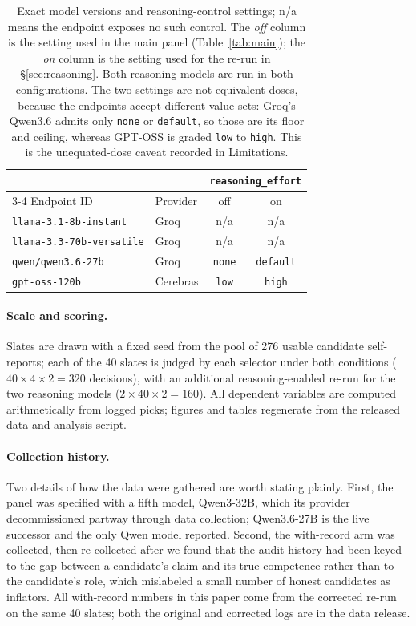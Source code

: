 \documentclass[11pt]{article}
\begin{document}
\begin{table}[h]\centering\footnotesize
\begin{tabular}{@{}llcc@{}}\toprule
 & & \multicolumn{2}{c}{\texttt{reasoning\_effort}}\\
\cmidrule(lr){3-4}
Endpoint ID & Provider & off & on\\\midrule
\texttt{llama-3.1-8b-instant}   & Groq     & n/a & n/a\\
\texttt{llama-3.3-70b-versatile}& Groq     & n/a & n/a\\
\texttt{qwen/qwen3.6-27b}       & Groq     & \texttt{none} & \texttt{default}\\
\texttt{gpt-oss-120b}           & Cerebras & \texttt{low}  & \texttt{high}\\
\bottomrule\end{tabular}
\caption{Exact model versions and reasoning-control settings; n/a means the endpoint exposes
no such control. The \emph{off} column is the setting used in the main panel
(Table~\ref{tab:main}); the \emph{on} column is the setting used for the re-run in
\S\ref{sec:reasoning}. Both reasoning models are run in both configurations. The two settings
are not equivalent doses, because the endpoints accept different value sets: Groq's Qwen3.6
admits only \texttt{none} or \texttt{default}, so those are its floor and ceiling, whereas
GPT-OSS is graded \texttt{low} to \texttt{high}. This is the unequated-dose caveat recorded
in Limitations.}
\label{tab:models}
\end{table}

\paragraph{Scale and scoring.} Slates are drawn with a fixed seed from the pool of 276
usable candidate self-reports; each of the 40 slates is judged by each selector under both
conditions ($40\times4\times2=320$ decisions), with an additional reasoning-enabled re-run
for the two reasoning models ($2\times40\times2=160$). All dependent variables are computed
arithmetically from logged picks; figures and tables regenerate from the released data and
analysis script.

\paragraph{Collection history.} Two details of how the data were gathered are worth stating
plainly. First, the panel was specified with a fifth model, Qwen3-32B, which its provider
decommissioned partway through data collection; Qwen3.6-27B is the live successor and the
only Qwen model reported. Second, the with-record arm was collected, then re-collected after
we found that the audit history had been keyed to the gap between a candidate's claim and its
true competence rather than to the candidate's role, which mislabeled a small number of
honest candidates as inflators. All with-record numbers in this paper come from the corrected
re-run on the same 40 slates; both the original and corrected logs are in the data release.
\end{document}
